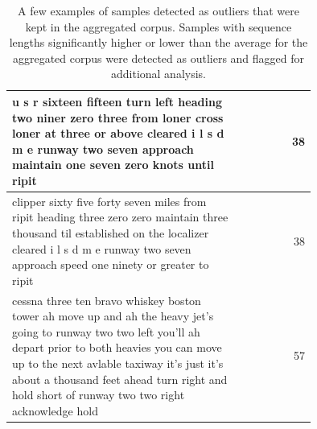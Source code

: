 \documentclass[12pt]{article}
\begin{document}
\begin{table}
\begin{tabular}{p{0.75\linewidth} r}
        \midrule
        u s r sixteen fifteen turn left heading two niner zero three from loner cross loner at three or above cleared i l s d m e runway two seven approach maintain one seven zero knots until ripit                                                                                                                               & 38              \\
        \midrule
        clipper sixty five forty seven miles from ripit heading three zero zero maintain three thousand til established on the localizer cleared i l s d m e runway two seven approach speed one ninety or greater to ripit                                                                                                         & 38              \\
        \midrule
        cessna three ten bravo whiskey boston tower ah move up and ah the heavy jet's going to runway two two left you'll ah depart prior to both heavies you can move up to the next avlable taxiway it's just it's about a thousand feet ahead turn right and hold short of runway two two right acknowledge hold                 & 57              \\
        \bottomrule
    \end{tabular}
    \caption{A few examples of samples detected as outliers that were kept in the aggregated corpus. Samples with sequence lengths significantly
        higher or lower than the average for the aggregated corpus were detected as outliers and flagged for additional analysis.}
    \label{tab:outlier_examples}
\end{table}

\newpage


\end{document}
